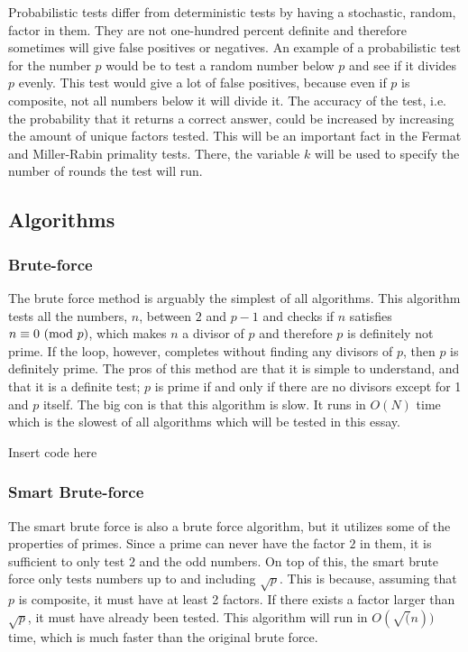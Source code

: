 \documentclass[main.tex]{subfiles}
\begin{document}
Probabilistic tests differ from deterministic tests by having a stochastic, random, factor in them. They are not one-hundred percent definite and therefore sometimes will give false positives or negatives. An example of a probabilistic test for the number $p$ would be to test a random number below $p$ and see if it divides $p$ evenly. This test would give a lot of false positives, because even if $p$ is composite, not all numbers below it will divide it. The accuracy of the test, i.e. the probability that it returns a correct answer, could be increased by increasing the amount of unique factors tested. This will be an important fact in the Fermat and Miller-Rabin primality tests. There, the variable $k$ will be used to specify the number of rounds the test will run. 

\subsection{Algorithms}

\subsubsection{Brute-force}
The brute force method is arguably the simplest of all algorithms. This algorithm tests all the numbers, $n$, between $2$ and $p-1$ and checks if $n$ satisfies $n \equiv 0 \ (\mathrm{mod}\ p)$, which makes $n$ a divisor of $p$ and therefore $p$ is definitely not prime. If the loop, however, completes without finding any divisors of $p$, then $p$ is definitely prime. The pros of this method are that it is simple to understand, and that it is a definite test; $p$ is prime if and only if there are no divisors except for 1 and $p$ itself. The big con is that this algorithm is slow. It runs in $O(N)$ time which is the slowest of all algorithms which will be tested in this essay. 

\begin{python}
    Insert code here
\end{python}

\subsubsection{Smart Brute-force}
The smart brute force is also a brute force algorithm, but it utilizes some of the properties of primes. Since a prime can never have the factor $2$ in them, it is sufficient to only test $2$ and the odd numbers. On top of this, the smart brute force only tests numbers up to and including $\sqrt{p}$. This is because, assuming that $p$ is composite, it must have at least 2 factors. If there exists a factor larger than $\sqrt{p}$, it must have already been tested. This algorithm will run in $O(\sqrt(n))$ time, which is much faster than the original brute force.
\end{document}
